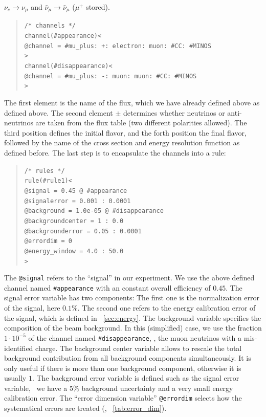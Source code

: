 $\nu_e\rightarrow\nu_\mu$  and $\bar\nu_\mu\rightarrow\bar\nu_\mu$ 
($\mu^+$ stored).
\begin{quote}
{\tt /* channels */}\\
{\tt channel(\#appearance)<}\\
{\tt \tb @channel = \#mu\_plus: +: electron: muon: \#CC: \#MINOS}\\
{\tt >}\\
{\tt channel(\#disappearance)<}\\
{\tt \tb @channel = \#mu\_plus: -: muon: muon: \#CC: \#MINOS}\\
{\tt >}
\end{quote}
The first element is the name of the flux, which we have already defined above as defined above. The second element $\pm$ determines whether 
neutrinos or anti-neutrinos are taken from the flux table (two different polarities allowed). The third position defines the initial flavor,
and the forth position the final flavor, followed by the name of the cross
section and energy resolution function as defined before.
%
The last step is to encapsulate the channels into a rule:
\begin{quote}
{\tt /* rules */}\\
{\tt rule(\#rule1)<}\\
{\tt \tb @signal = 0.45 @ \#appearance}\\
{\tt \tb @signalerror = 0.001 : 0.0001}\\
{\tt \tb @background = 1.0e-05 @ \#disappearance}\\
{\tt \tb @backgroundcenter = 1 : 0.0}\\
{\tt \tb @backgrounderror = 0.05 : 0.0001}\\
{\tt \tb @errordim = 0}\\
{\tt \tb @energy\_window = 4.0 : 50.0}\\
{\tt >}
\end{quote}
The {\tt @signal} refers to the ``signal'' in our experiment. We use the
above defined channel named {\tt \#appearance} with an constant overall
efficiency of $0.45$. The signal error variable has two components: 
The first one is the normalization error of the signal, here $0.1\%$. The second 
one refers to the energy calibration error of the signal, which is defined 
in \Sec~\ref{sec:energy}. The background variable
specifies the composition of the beam background. In this (simplified) case, we
use the fraction $1\cdot 10^{-5}$ of the channel named {\tt \#disappearance}, \ie , the muon neutrinos with a mis-identified charge. The background center variable allows to rescale the total background contribution from all background components
simultaneously. It is only useful if there is more than one background component, otherwise it is usually $1$. The background error variable is defined such as the signal error variable, \ie\ we have a $5\%$ background uncertainty and a very small energy calibration error. The ``error dimension variable'' {\tt @errordim} selects how the systematical errors are treated (\cf, \Tab~\ref{tab:error_dim}). 

